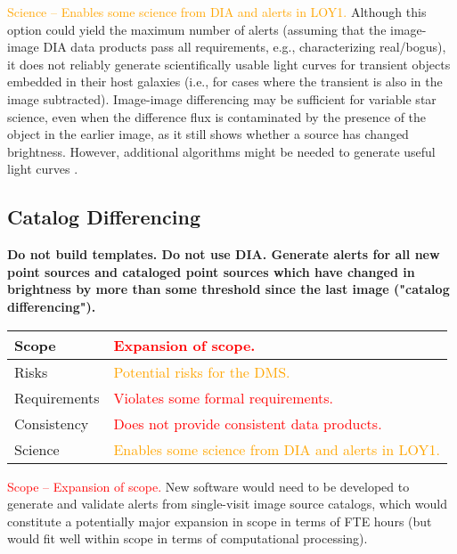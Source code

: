 \documentclass[DM,lsstdraft,toc]{lsstdoc}
\begin{document}
\textcolor{orange}{ Science -- Enables some science from DIA and alerts in LOY1.} Although this option could yield the maximum number of alerts (assuming that the image-image DIA data products pass all requirements, e.g., characterizing real/bogus), it does not reliably generate scientifically usable light curves for transient objects embedded in their host galaxies (i.e., for cases where the transient is also in the image subtracted). Image-image differencing may be sufficient for variable star science, even when the difference flux is contaminated by the presence of the object in the earlier image, as it still shows whether a source has changed brightness. However, additional algorithms might be needed to generate useful light curves \citep[e.g.,][]{2005AJ....130.2272B}.


\clearpage
\subsection{Catalog Differencing}\label{ssec:potsol_catdiff}

{\bf Do not build templates. Do not use DIA. Generate alerts for all new point sources and cataloged point sources which have changed in brightness by more than some threshold since the last image ("catalog differencing").}

\begin{center}
\begin{tabular}{|p{2.5cm}|p{13cm}|}
\hline
Scope & \textcolor{red}{Expansion of scope.}  \\
\hline
Risks & \textcolor{orange}{Potential risks for the DMS.} \\
\hline
Requirements & \textcolor{red}{Violates some formal requirements.} \\
\hline
Consistency & \textcolor{red}{Does not provide consistent data products.} \\
\hline
Science & \textcolor{orange}{Enables some science from DIA and alerts in LOY1.} \\
\hline
\end{tabular}
\end{center}

\textcolor{red}{Scope -- Expansion of scope.} New software would need to be developed to generate and validate alerts from single-visit image source catalogs, which would constitute a potentially major expansion in scope in terms of FTE hours (but would fit well within scope in terms of computational processing).
\end{document}
